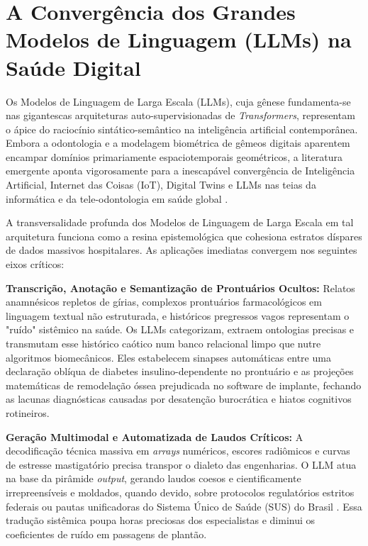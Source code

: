 \section{A Convergência dos Grandes Modelos de Linguagem (LLMs) na Saúde Digital}
\label{sec:ia-llms}

Os Modelos de Linguagem de Larga Escala (LLMs), cuja gênese fundamenta-se nas gigantescas arquiteturas auto-supervisionadas de \textit{Transformers}, representam o ápice do raciocínio sintático-semântico na inteligência artificial contemporânea. Embora a odontologia e a modelagem biométrica de gêmeos digitais aparentem encampar domínios primariamente espaciotemporais geométricos, a literatura emergente aponta vigorosamente para a inescapável convergência de Inteligência Artificial, Internet das Coisas (IoT), Digital Twins e LLMs nas teias da informática e da tele-odontologia em saúde global \cite{digital2025convergence}.


A transversalidade profunda dos Modelos de Linguagem de Larga Escala em tal arquitetura funciona como a resina epistemológica que cohesiona estratos díspares de dados massivos hospitalares. As aplicações imediatas convergem nos seguintes eixos críticos:

\textbf{Transcrição, Anotação e Semantização de Prontuários Ocultos:} Relatos anamnésicos repletos de gírias, complexos prontuários farmacológicos em linguagem textual não estruturada, e históricos pregressos vagos representam o "ruído" sistêmico na saúde. Os LLMs categorizam, extraem ontologias precisas e transmutam esse histórico caótico num banco relacional limpo que nutre algoritmos biomecânicos. Eles estabelecem sinapses automáticas entre uma declaração oblíqua de diabetes insulino-dependente no prontuário e as projeções matemáticas de remodelação óssea prejudicada no software de implante, fechando as lacunas diagnósticas causadas por desatenção burocrática e hiatos cognitivos rotineiros.

\textbf{Geração Multimodal e Automatizada de Laudos Críticos:} A decodificação técnica massiva em \textit{arrays} numéricos, escores radiômicos e curvas de estresse mastigatório precisa transpor o dialeto das engenharias. O LLM atua na base da pirâmide \textit{output}, gerando laudos coesos e cientificamente irrepreensíveis e moldados, quando devido, sobre protocolos regulatórios estritos federais ou pautas unificadoras do Sistema Único de Saúde (SUS) do Brasil \cite{frota2025sus}. Essa tradução sistêmica poupa horas preciosas dos especialistas e diminui os coeficientes de ruído em passagens de plantão.


